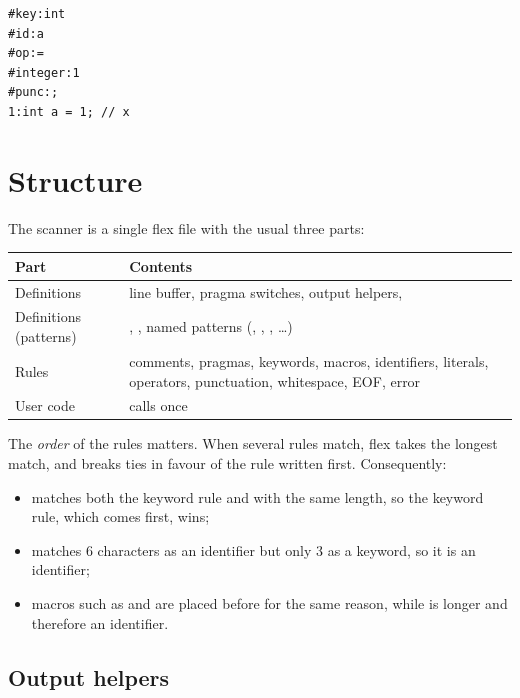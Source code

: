 \documentclass[12pt]{article}
\begin{document}
\begin{lstlisting}[language={},numbers=none,title={\codetitle{input: int a = 1; // x}}]
#key:int
#id:a
#op:=
#integer:1
#punc:;
1:int a = 1; // x
\end{lstlisting}

\section{Structure}

The scanner is a single flex file with the usual three parts:

\begin{center}
\begin{tabularx}{0.92\linewidth}{@{}lL@{}}
\toprule
Part & Contents \\
\midrule
Definitions  & line buffer, pragma switches, output helpers,  \\
Definitions (patterns) & , , named patterns (, , , \ldots) \\
Rules & comments, pragmas, keywords, macros, identifiers, literals, operators, punctuation, whitespace, EOF, error \\
User code &  calls  once \\
\bottomrule
\end{tabularx}
\end{center}

The \emph{order} of the rules matters. When several rules match, flex takes the longest match, and
breaks ties in favour of the rule written first. Consequently:

\begin{itemize}
  \item {} matches both the keyword rule and  with the same length, so the
        keyword rule, which comes first, wins;
  \item {} matches 6 characters as an identifier but only 3 as a keyword, so it is an identifier;
  \item macros such as  and  are placed before  for the same reason,
        while  is longer and therefore an identifier.
\end{itemize}

\subsection{Output helpers}
\end{document}

